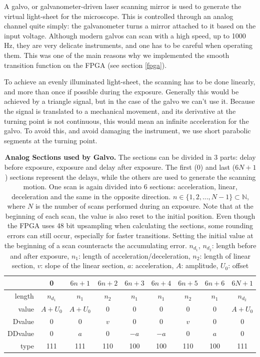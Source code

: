 \documentclass{diploma_style}
\begin{document}
A galvo, or galvanometer-driven laser scanning mirror is used to generate the virtual light-sheet for the microscope. This is controlled through an analog channel quite simply: the galvanometer turns a mirror attached to it based on the input voltage. Although modern galvos can scan with a high speed, up to 1000 Hz, they are very delicate instruments, and one has to be careful when operating them. This was one of the main reasons why we implemented the smooth transition function on the FPGA (see section \ref{fpga}).

To achieve an evenly illuminated light-sheet, the scanning has to be done linearly, and more than once if possible during the exposure. Generally this would be achieved by a triangle signal, but in the case of the galvo we can't use it. Because the signal is translated to a mechanical movement, and its derivative at the turning point is not continuous, this would mean an infinite acceleration for the galvo. To avoid this, and avoid damaging the instrument, we use short parabolic segments at the turning point.


\begin{table}[phtb]
\centering
\begin{tabular}{r|c||c|c|c|c|c|c||c}
			& 0 & $6n+1$ & $6n+2$ & $6n+3$ & $6n+4$ & $6n+5$ & $6n+6$ & $6N+1$ \\ \hline \hline
	length  & $n_{d_1}$ & $n_1$  & $n_2$ & $n_1$ & $n_1$ & $n_2$ & $n_1$ & $n_{d_2}$ \\
	value   & $A+U_0$   & $A+U_0$& 0     & 0     & 0     & 0     & 0     & $A+U_0$       \\
	Dvalue  & 0         & 0      & $v$   & 0     & 0     & $v$   & 0     & 0         \\
	DDvalue & 0         & $a$    & 0     & $-a$  & $-a$  & 0     & $a$   & 0         \\
	type    & 111       & 111    & 110   & 100   & 100   & 110   & 100   & 111       \\
\end{tabular}
\caption{\textbf{Analog Sections used by Galvo.} The sections can be divided in 3 parts: delay before exposure, exposure and delay after exposure. The first (0) and last ($6N+1$) sections represent the delays, while the others are used to generate the scanning motion. One scan is again divided into 6 sections: acceleration, linear, deceleration and the same in the opposite direction. $n\in \{1, 2, ... , N-1\} \subset \mathbb{N}$, where $N$ is the number of scans performed during an exposure. Note that at the beginning of each scan, the value is also reset to the initial position. Even though the FPGA uses 48 bit upsampling when calculating the sections, some rounding errors can still occur, especially for faster transitions. Setting the initial value at the beginning of a scan counteracts the accumulating error. $n_{d_1}$, $n_{d_2}$: length before and after exposure, $n_1$: length of acceleration/deceleration, $n_2$: length of linear section, $v$: slope of the linear section, $a$: acceleration, $A$: amplitude, $U_0$: offset}
\label{tab:galvo}
\end{table}
\end{document}

